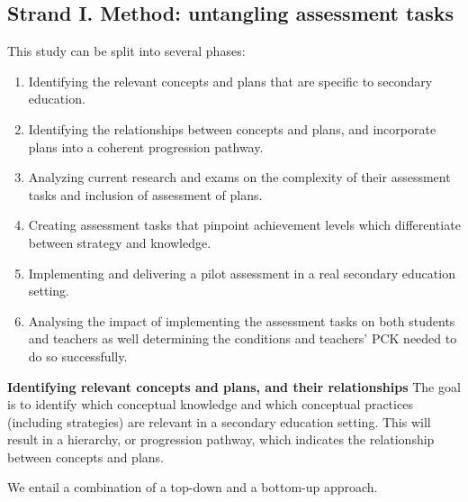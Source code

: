 \subsection{Strand I. Method: untangling assessment tasks}

This study can be split into several phases:
\begin{enumerate}
\item Identifying the relevant concepts and plans that are specific to secondary education.
\item Identifying the relationships between concepts and plans, and incorporate plans into a coherent progression pathway.
\item Analyzing current research and exams on the complexity of their assessment tasks and inclusion of assessment of plans.
\item Creating assessment tasks that pinpoint achievement levels which differentiate between strategy and knowledge.
\item Implementing and delivering a pilot assessment in a real secondary education setting.
\item Analysing the impact of implementing the assessment tasks on both students and teachers as well determining the conditions and teachers' PCK needed to do so successfully.
\end{enumerate}



\noindent \textbf{Identifying relevant concepts and plans, and their relationships}\newline
The goal is to identify which conceptual knowledge and which conceptual practices (including strategies) are relevant in a secondary education setting. This will result in a hierarchy, or progression pathway, which indicates the relationship between concepts and plans.

We entail a combination of a top-down and a bottom-up approach.

